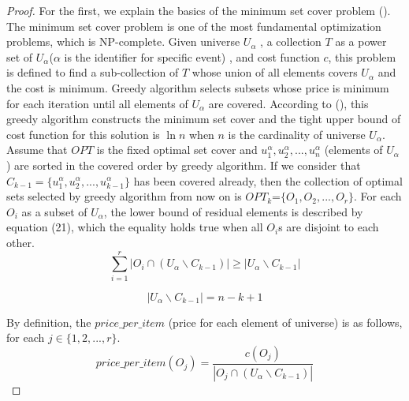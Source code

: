 \begin{proof} 
For the first, we explain the basics of the minimum set cover problem (\cite{HalimG16}).
The minimum set cover problem is one of the most fundamental optimization problems, which is NP-complete. 
Given universe $U_\alpha$ , a collection $T$ as a power set of $U_\alpha$($\alpha$ is the identifier for specific event) 
, and cost function $c$, this problem is defined to find a sub-collection of $T$ whose union of all elements covers $U_{\alpha}$ 
and the cost is minimum. 
Greedy algorithm selects subsets whose price is minimum for each iteration until all elements of $U_{\alpha}$ are covered.
According to (\cite{HalimG16}), this greedy algorithm constructs the minimum set cover and 
the tight upper bound of cost function for this solution is $\ln n$ 
when $n$ is the cardinality of universe $U_{\alpha}$.
Assume that $OPT$ is the fixed optimal set cover and $u^{\alpha}_1,u^{\alpha}_2,...,u^{\alpha}_{n}$ 
(elements of $U_{\alpha}$) are sorted in the covered order by greedy algorithm.
If we consider that $C_{k-1}=\{u^{\alpha}_1,u^{\alpha}_2,...,u^{\alpha}_{k-1}\}$ has been covered already, 
then the collection of optimal sets selected by greedy algorithm from now on is $OPT_k$=$\{O_1, O_2,...,O_r\}$. 
For each $O_i$ as a subset of $U_{\alpha}$, the lower bound of residual elements is described by equation (21),
which the equality holds true when all $O_i$s are disjoint to each other. %
\begin{equation}
\label{lower_bound_msc}
\sum_{i=1}^r |O_i\cap(U_{\alpha}\backslash C_{k-1})| 
\ge |U_{\alpha}\backslash C_{k-1}|
\end{equation}

\begin{equation}
\label{cardinality_residual_candi}
|U_{\alpha}\backslash C_{k-1}| = n-k+1
\end{equation}

By definition, the $price\_per\_item$ (price for each element of universe) is as follows, 
for each $j \in \{1,2,...,r\}$.
\begin{equation}
\label{price_per_item_selection}
price\_per\_item(O_j)=\frac{c(O_j)}{|O_j \cap (U_{\alpha} \backslash C_{k-1})|}
\end{equation}


\end{proof}
